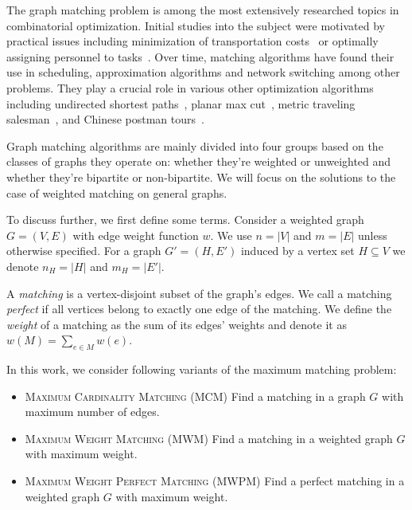 The graph matching problem is among the most extensively researched topics in combinatorial optimization. Initial studies into the subject were motivated by practical issues including minimization of transportation costs~\cite{hitchcock1941distribution} or optimally assigning personnel to tasks~\cite{thorndike1950problem}. Over time, matching algorithms have found their use in scheduling, approximation algorithms and network switching among other problems. They play a crucial role in various other optimization algorithms including undirected shortest paths~\cite{lawler2001combinatorial}, planar max cut~\cite{hadlock1975finding}, metric traveling salesman~\cite{christofides2022worst}, and Chinese postman tours~\cite{edmonds1973matching}.

Graph matching algorithms are mainly divided into four groups based on the classes of graphs they operate on: whether they're weighted or unweighted and whether they're bipartite or non-bipartite. We will focus on the solutions to the case of weighted matching on general graphs.

To discuss further, we first define some terms. Consider a weighted graph $G = (V, E)$ with edge weight function $w$. We use $n = |V|$ and $m = |E|$ unless otherwise specified. For a graph $G'=(H, E')$ induced by a vertex set $H \subseteq V$ we denote $n_H = |H|$ and $m_H = |E'|$.

A \textit{matching} is a vertex-disjoint subset of the graph's edges. We call a matching \textit{perfect} if all vertices belong to exactly one edge of the matching. We define the \textit{weight} of a matching as the sum of its edges' weights and denote it as $w(M) = \sum_{e \in M} w(e)$.

In this work, we consider following variants of the maximum matching problem:

\begin{itemize}
    \item \textsc{Maximum Cardinality Matching} (\textsc{MCM}) Find a matching in a graph $G$ with maximum number of edges.
    \item \textsc{Maximum Weight Matching} (\textsc{MWM}) Find a matching in a weighted graph $G$ with maximum weight.
    \item \textsc{Maximum Weight Perfect Matching} (\textsc{MWPM}) Find a perfect matching in a weighted graph $G$ with maximum weight.
\end{itemize}

